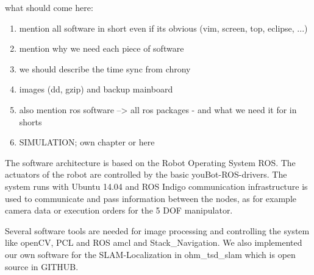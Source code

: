 what should come here:
\begin{enumerate}
	\item mention all software in short even if its obvious (vim, screen, top, eclipse, ...)
	\item mention why we need each piece of software
	\item we should describe the time sync from chrony 
	\item images (dd, gzip) and backup mainboard
	\item also mention ros software --> all ros packages - and what we need it for in shorts
	\item SIMULATION; own chapter or here 
\end{enumerate}

The software architecture is based on the Robot Operating System ROS. The actuators of the robot are controlled by the basic youBot-ROS-drivers. The system runs with Ubuntu 14.04 and ROS Indigo communication infrastructure is used to communicate and pass information between the nodes, as for example camera data or execution orders for the 5 DOF manipulator. 

Several software tools are needed for image processing and controlling the system like openCV, PCL and ROS amcl and Stack\_Navigation.
We also implemented our own software for the SLAM-Localization in ohm\_tsd\_slam which is open source in GITHUB. 